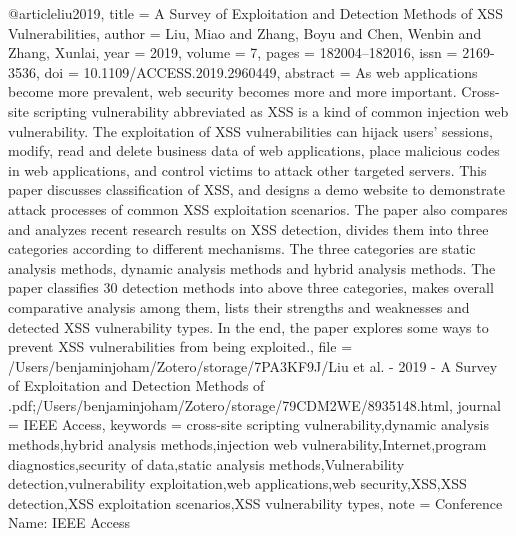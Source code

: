@article{liu2019,
  title = {A {{Survey}} of {{Exploitation}} and {{Detection Methods}} of {{XSS Vulnerabilities}}},
  author = {Liu, Miao and Zhang, Boyu and Chen, Wenbin and Zhang, Xunlai},
  year = {2019},
  volume = {7},
  pages = {182004--182016},
  issn = {2169-3536},
  doi = {10.1109/ACCESS.2019.2960449},
  abstract = {As web applications become more prevalent, web security becomes more and more important. Cross-site scripting vulnerability abbreviated as XSS is a kind of common injection web vulnerability. The exploitation of XSS vulnerabilities can hijack users' sessions, modify, read and delete business data of web applications, place malicious codes in web applications, and control victims to attack other targeted servers. This paper discusses classification of XSS, and designs a demo website to demonstrate attack processes of common XSS exploitation scenarios. The paper also compares and analyzes recent research results on XSS detection, divides them into three categories according to different mechanisms. The three categories are static analysis methods, dynamic analysis methods and hybrid analysis methods. The paper classifies 30 detection methods into above three categories, makes overall comparative analysis among them, lists their strengths and weaknesses and detected XSS vulnerability types. In the end, the paper explores some ways to prevent XSS vulnerabilities from being exploited.},
  file = {/Users/benjaminjoham/Zotero/storage/7PA3KF9J/Liu et al. - 2019 - A Survey of Exploitation and Detection Methods of .pdf;/Users/benjaminjoham/Zotero/storage/79CDM2WE/8935148.html},
  journal = {IEEE Access},
  keywords = {cross-site scripting vulnerability,dynamic analysis methods,hybrid analysis methods,injection web vulnerability,Internet,program diagnostics,security of data,static analysis methods,Vulnerability detection,vulnerability exploitation,web applications,web security,XSS,XSS detection,XSS exploitation scenarios,XSS vulnerability types},
  note = {Conference Name: IEEE Access}
}


